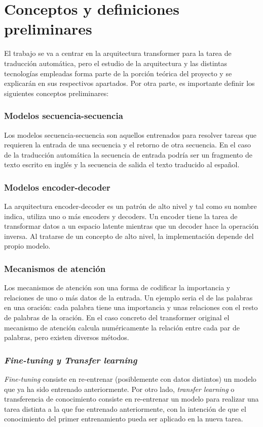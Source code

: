 \section{Conceptos y definiciones preliminares}
El trabajo se va a centrar en la arquitectura transformer \cite{Vaswani2017Jun} para la tarea de traducción automática, pero el estudio de la arquitectura y las distintas tecnologías empleadas forma parte de la porción teórica del proyecto y se explicarán en sus respectivos apartados.
Por otra parte, es importante definir los siguientes conceptos preliminares:

\subsubsection{Modelos secuencia-secuencia}
Los modelos secuencia-secuencia son aquellos entrenados para
resolver tareas que requieren la entrada de una secuencia y el retorno de
otra secuencia.
En el caso de la traducción automática la secuencia de entrada podría ser
un fragmento de texto escrito en inglés y la secuencia de salida el texto
traducido al español.

\subsubsection{Modelos encoder-decoder}
La arquitectura encoder-decoder es un patrón de alto nivel y tal como su nombre indica,
utiliza uno o más encoders y decoders.
Un encoder tiene la tarea de transformar datos a un espacio latente
mientras que un decoder hace la operación inversa. Al tratarse de un concepto de alto nivel, la
implementación depende del propio modelo.

\subsubsection{Mecanismos de atención}
Los mecanismos de atención son una forma de codificar la importancia y relaciones de uno o más
datos de la entrada. Un ejemplo seria el de las palabras en una oración: cada palabra tiene una
importancia y unas relaciones con el resto de palabras de la oración.
En el caso concreto del transformer original \cite{Vaswani2017Jun} el mecanismo de atención
calcula numéricamente la relación entre cada par de palabras, pero existen diversos métodos.

\subsubsection{\textit{Fine-tuning y Transfer learning}}
\textit{Fine-tuning} consiste en re-entrenar (posiblemente con datos distintos) un modelo que ya ha
sido entrenado anteriormente. Por otro lado, \textit{transfer learning} o transferencia de conocimiento
consiste en re-entrenar un modelo para realizar una tarea distinta a la que fue entrenado anteriormente,
con la intención de que el conocimiento del primer entrenamiento pueda ser aplicado en la nueva tarea.

